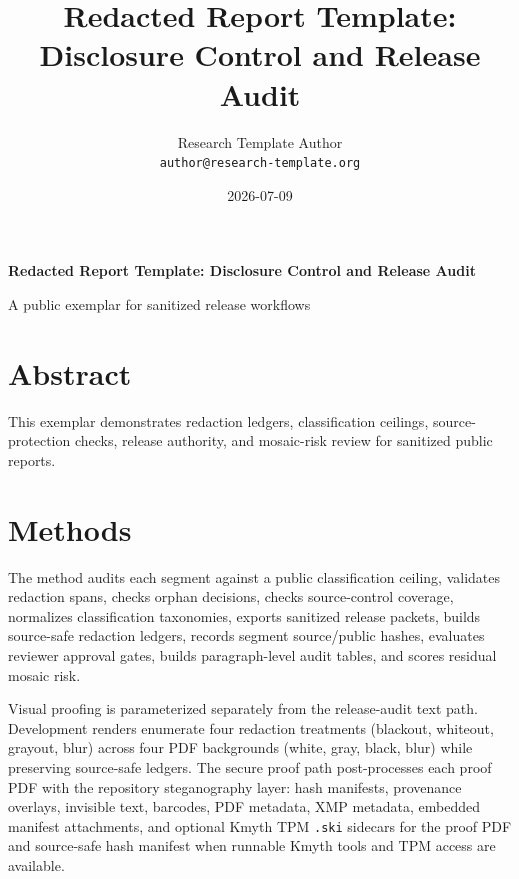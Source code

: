 \documentclass[
]{article}
\author{}
\date{}
\title{Redacted Report Template: Disclosure Control and Release Audit}
\author{Research Template Author\\\footnotesize{\texttt{author@research-template.org}}}
\date{2026-07-09}
\begin{document}
\begin{titlepage}
\centering
\vspace*{2cm}
{\LARGE\bfseries Redacted Report Template: Disclosure Control and Release Audit\par}
\vspace{0.75em}
{\large A public exemplar for sanitized release workflows\par}
\vfill
\makeatletter
{\@author\par}
\vspace{1em}
{\@date\par}
\makeatother
\vfill
\end{titlepage}
\thispagestyle{empty}
\tableofcontents
\newpage


\section{Abstract}\label{abstract}

This exemplar demonstrates redaction ledgers, classification ceilings,
source-protection checks, release authority, and mosaic-risk review for
sanitized public reports.

\newpage

\section{Methods}\label{methods}

The method audits each segment against a public classification ceiling,
validates redaction spans, checks orphan decisions, checks
source-control coverage, normalizes classification taxonomies, exports
sanitized release packets, builds source-safe redaction ledgers, records
segment source/public hashes, evaluates reviewer approval gates, builds
paragraph-level audit tables, and scores residual mosaic risk.

Visual proofing is parameterized separately from the release-audit text
path. Development renders enumerate four redaction treatments (blackout,
whiteout, grayout, blur) across four PDF backgrounds (white, gray,
black, blur) while preserving source-safe ledgers. The secure proof path
post-processes each proof PDF with the repository steganography layer:
hash manifests, provenance overlays, invisible text, barcodes, PDF
metadata, XMP metadata, embedded manifest attachments, and optional
Kmyth TPM \texttt{.ski} sidecars for the proof PDF and source-safe hash
manifest when runnable Kmyth tools and TPM access are available.
\end{document}
